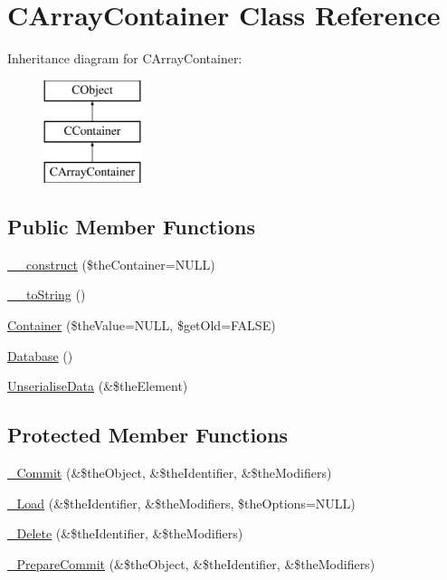 \hypertarget{class_c_array_container}{\section{C\-Array\-Container Class Reference}
\label{class_c_array_container}
}
Inheritance diagram for C\-Array\-Container\-:\begin{figure}[H]
\begin{center}
\leavevmode
\includegraphics[height=3.000000cm]{class_c_array_container}
\end{center}
\end{figure}
\subsection*{Public Member Functions}
\begin{DoxyCompactItemize}
\item 
\hyperlink{class_c_array_container_a10e83176c2a2ee0d9fe53ca9e51b0ca0}{\-\_\-\-\_\-construct} (\$the\-Container=N\-U\-L\-L)
\item 
\hyperlink{class_c_array_container_aa7739e1def0a13a6750d6fa722952bcc}{\-\_\-\-\_\-to\-String} ()
\item 
\hyperlink{class_c_array_container_ac63eeb55a8c374668c5c443fb6e27df3}{Container} (\$the\-Value=N\-U\-L\-L, \$get\-Old=F\-A\-L\-S\-E)
\item 
\hyperlink{class_c_array_container_a2f9d4c3085fd60c39e41b6b8633b145b}{Database} ()
\item 
\hyperlink{class_c_array_container_af7892ddf82b819514d94cdf6b6e1b491}{Unserialise\-Data} (\&\$the\-Element)
\end{DoxyCompactItemize}
\subsection*{Protected Member Functions}
\begin{DoxyCompactItemize}
\item 
\hyperlink{class_c_array_container_a8f58eaea0751d43e4ac7a5d4c732ddaa}{\-\_\-\-Commit} (\&\$the\-Object, \&\$the\-Identifier, \&\$the\-Modifiers)
\item 
\hyperlink{class_c_array_container_af017b1ca4c000284b3d1ff753a6f9238}{\-\_\-\-Load} (\&\$the\-Identifier, \&\$the\-Modifiers, \$the\-Options=N\-U\-L\-L)
\item 
\hyperlink{class_c_array_container_ac8469e57be785cd45142fdaf0419bf8f}{\-\_\-\-Delete} (\&\$the\-Identifier, \&\$the\-Modifiers)
\item 
\hyperlink{class_c_array_container_ad77352799ccd0807013a133ccf5fd2bc}{\-\_\-\-Prepare\-Commit} (\&\$the\-Object, \&\$the\-Identifier, \&\$the\-Modifiers)
\end{DoxyCompactItemize}
